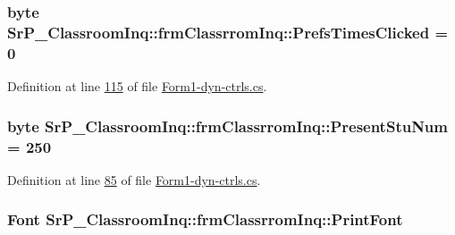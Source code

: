 \hypertarget{class_sr_p___classroom_inq_1_1frm_classrrom_inq_a649306fdbca853561ee4a6cac829315a}{
\subsubsection[{\-Prefs\-Times\-Clicked}]{\setlength{\rightskip}{0pt plus 5cm}byte {\bf \-Sr\-P\-\_\-\-Classroom\-Inq\-::frm\-Classrrom\-Inq\-::\-Prefs\-Times\-Clicked} = 0}}
\label{class_sr_p___classroom_inq_1_1frm_classrrom_inq_a649306fdbca853561ee4a6cac829315a}


\-Definition at line \hyperlink{_form1-dyn-ctrls_8cs_source_l00115}{115} of file \hyperlink{_form1-dyn-ctrls_8cs_source}{\-Form1-\/dyn-\/ctrls.\-cs}.

\hypertarget{class_sr_p___classroom_inq_1_1frm_classrrom_inq_ad5da56ffdb5d79486d9cf4eb7c3f44d4}{
\subsubsection[{\-Present\-Stu\-Num}]{\setlength{\rightskip}{0pt plus 5cm}byte {\bf \-Sr\-P\-\_\-\-Classroom\-Inq\-::frm\-Classrrom\-Inq\-::\-Present\-Stu\-Num} = 250}}
\label{class_sr_p___classroom_inq_1_1frm_classrrom_inq_ad5da56ffdb5d79486d9cf4eb7c3f44d4}


\-Definition at line \hyperlink{_form1-dyn-ctrls_8cs_source_l00085}{85} of file \hyperlink{_form1-dyn-ctrls_8cs_source}{\-Form1-\/dyn-\/ctrls.\-cs}.

\hypertarget{class_sr_p___classroom_inq_1_1frm_classrrom_inq_a314e4a61ea8458c5198273335dcf0b5f}{
\subsubsection[{\-Print\-Font}]{\setlength{\rightskip}{0pt plus 5cm}\-Font {\bf \-Sr\-P\-\_\-\-Classroom\-Inq\-::frm\-Classrrom\-Inq\-::\-Print\-Font}}}
\label{class_sr_p___classroom_inq_1_1frm_classrrom_inq_a314e4a61ea8458c5198273335dcf0b5f}


